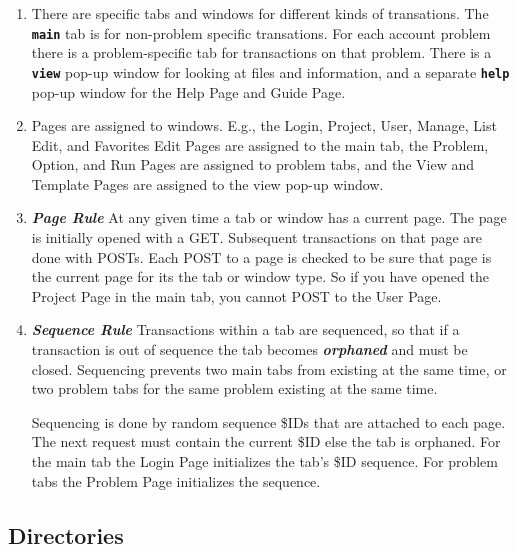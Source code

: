 \documentclass[12pt]{article}
\newcommand{\TT}[1]{{\tt \bfseries #1}}
\newcommand{\key}[1]{{\bf \em #1}}
\begin{document}
\begin{enumerate}
\item There are specific tabs and windows for different kinds
of transations.  The \TT{main} tab is for non-problem specific
transations.  For each account problem there is a problem-specific
tab for transactions on that problem.  There is a \TT{view}
pop-up window for looking at files and information, and a
separate \TT{help} pop-up window for the Help Page and Guide Page.

\item Pages are assigned to windows.  E.g., the Login, Project,
User, Manage, List Edit, and Favorites Edit Pages are assigned
to the main tab, the
Problem, Option, and Run Pages are assigned to problem tabs,
and the View and Template Pages are assigned to the view pop-up
window.

\item \key{Page Rule}\label{PAGE-RULE}
At any given time a tab or window has a current page.
The page is initially opened with a GET.  Subsequent
transactions on that page are done with POSTs.  Each POST to
a page is checked to be sure that page is the current page for
its the tab or window type.  So if you have opened the Project Page
in the main tab, you cannot POST to the User Page.

\item \key{Sequence Rule}\label{SEQUENCE-RULE}
Transactions within a tab are sequenced, so that
if a transaction is out of sequence the tab becomes
\key{orphaned} and must be closed.
Sequencing prevents two main
tabs from existing at the same time, or two problem tabs
for the same problem existing at the same time.

Sequencing is done
by random sequence \$IDs that are attached to each page.
The next request must contain the current \$ID else the
tab is orphaned.  For the main tab the Login Page initializes
the tab's \$ID sequence.  For problem tabs the Problem Page
initializes the sequence.
\end{enumerate}

\subsection{Directories}
\end{document}
